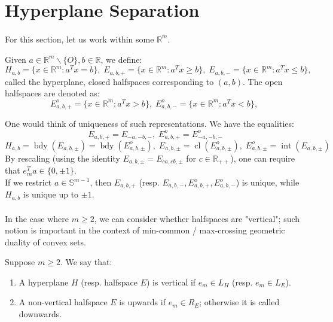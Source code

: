 \section{Hyperplane Separation}
\label{sect:015}
\paragraph{}For this section, let us work within some $\mathbb{R}^m$.

\begin{defn}\label{defn:015-hyperplanes-halfspaces}
	Given $a\in \mathbb{R}^{m}\smallsetminus \{O\},b\in \mathbb{R}$, we define:
	\[
		H_{a,b}=\{x\in \mathbb{R}^m:a^Tx=b\},\;
		E_{a,b,+}=\{x\in \mathbb{R}^m:a^Tx\geq b\},\;
		E_{a,b,-}=\{x\in \mathbb{R}^m:a^Tx\leq b\},\;
	\]
	called the hyperplane, closed halfspaces corresponding to $(a,b)$. The open halfspaces are denoted as:
	\[
		E_{a,b,+}^o=\{x\in \mathbb{R}^m:a^Tx> b\},\;
		E_{a,b,-}^o=\{x\in \mathbb{R}^m:a^Tx< b\},\;
	\]
\end{defn}

\begin{rmrk}
	One would think of uniqueness of such representations. We have the equalities:
	\[
		E_{a,b,+}=E_{-a,-b,-},\;E^o_{a,b,+}=E^o_{-a,-b,-}
	\]
	\[
		H_{a,b}=\operatorname{bdy}(E_{a,b,\pm})=\operatorname{bdy}(E_{a,b,\pm}^o),\;
		E_{a,b,\pm}=\operatorname{cl}(E_{a,b,\pm}^o),\;
		E^o_{a,b,\pm}=\operatorname{int}(E_{a,b,\pm})
	\]
	By rescaling (using the identity $E_{a,b,\pm}=E_{ca,cb,\pm}$ for $c\in \mathbb{R}_{++}$), one can require that $e^T_ma\in \{0,\pm1\}$.\\
	If we restrict $a\in \mathbb{S}^{m-1}$, then $E_{a,b,+}$ (resp. $E_{a,b,-},E_{a,b,+}^o,E_{a,b,-}^o$) is unique, while $H_{a,b}$ is unique up to $\pm 1$.
\end{rmrk}

\paragraph{}In the case where $m\geq 2$, we can consider whether halfspaces are "vertical"; such notion is important in the context of min-common / max-crossing geometric duality of convex sets.

\begin{defn}\label{defn:015-verticality}
	Suppose $m\geq 2$. We say that:
	\begin{enumerate}[label=(\alph*)]
		\item A hyperplane $H$ (resp. halfspace $E$) is vertical if $e_m\in L_H$ (resp. $e_m\in L_E$).
		\item A non-vertical halfspace $E$ is upwards if $e_m\in R_E$; otherwise it is called downwards.
	\end{enumerate}
\end{defn}

